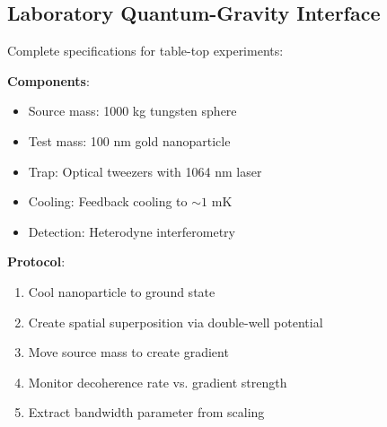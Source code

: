 \documentclass[twocolumn,prd,amsmath,amssymb,aps,superscriptaddress,nofootinbib]{revtex4-2}
\begin{document}
\subsection{Laboratory Quantum-Gravity Interface}

Complete specifications for table-top experiments:

\textbf{Components}:
\begin{itemize}
\item Source mass: 1000 kg tungsten sphere
\item Test mass: 100 nm gold nanoparticle
\item Trap: Optical tweezers with 1064 nm laser
\item Cooling: Feedback cooling to $\sim 1$ mK
\item Detection: Heterodyne interferometry
\end{itemize}

\textbf{Protocol}:
\begin{enumerate}
\item Cool nanoparticle to ground state
\item Create spatial superposition via double-well potential
\item Move source mass to create gradient
\item Monitor decoherence rate vs. gradient strength
\item Extract bandwidth parameter from scaling
\end{enumerate}
\end{document}
